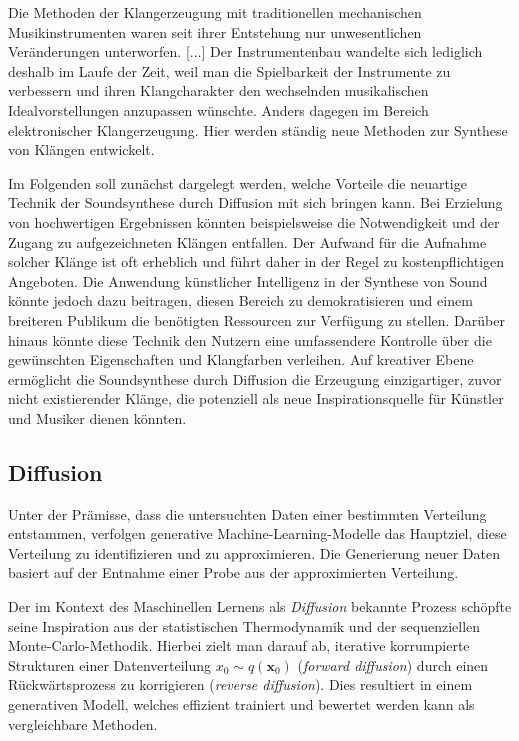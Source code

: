 \documentclass[
  a4paper,  %
  twoside,  %
  bibliography=totoc,
  headsepline,
  cleardoublepage=empty,
  parskip=half,
  draft=false
]{scrbook}
\begin{document}
\glqq Die Methoden der Klangerzeugung mit traditionellen mechanischen Musikinstrumenten waren seit ihrer Entstehung nur unwesentlichen Veränderungen unterworfen. [...] Der Instrumentenbau wandelte sich lediglich deshalb im Laufe der Zeit, weil man die Spielbarkeit der Instrumente zu verbessern und ihren Klangcharakter den wechselnden musikalischen Idealvorstellungen anzupassen wünschte. Anders dagegen im Bereich elektronischer Klangerzeugung. Hier werden ständig neue Methoden zur Synthese von Klängen entwickelt.\grqq \, \cite{ruschkowski_elektronische_2019}

Im Folgenden soll zunächst dargelegt werden, welche Vorteile die neuartige Technik der Soundsynthese durch Diffusion mit sich bringen kann. Bei Erzielung von hochwertigen Ergebnissen könnten beispielsweise die Notwendigkeit und der Zugang zu aufgezeichneten Klängen entfallen. Der Aufwand für die Aufnahme solcher Klänge ist oft erheblich und führt daher in der Regel zu kostenpflichtigen Angeboten. Die Anwendung künstlicher Intelligenz in der Synthese von Sound könnte jedoch dazu beitragen, diesen Bereich zu demokratisieren und einem breiteren Publikum die benötigten Ressourcen zur Verfügung zu stellen. Darüber hinaus könnte diese Technik den Nutzern eine umfassendere Kontrolle über die gewünschten Eigenschaften und Klangfarben verleihen. Auf kreativer Ebene ermöglicht die Soundsynthese durch Diffusion die Erzeugung einzigartiger, zuvor nicht existierender Klänge, die potenziell als neue Inspirationsquelle für Künstler und Musiker dienen könnten. \cite{haohe_liu_audioldm_2023-1}


\subsection{Diffusion}
Unter der Prämisse, dass die untersuchten Daten einer bestimmten Verteilung entstammen, verfolgen generative Machine-Learning-Modelle das Hauptziel, diese Verteilung zu identifizieren und zu approximieren. Die Generierung neuer Daten basiert auf der Entnahme einer Probe aus der approximierten Verteilung.\cite{machine_learning_at_berkeley_diffusion_2022}

Der im Kontext des Maschinellen Lernens als \emph{Diffusion} bekannte Prozess\cite{sohl-dickstein_deep_2015, ho_denoising_2020, nichol_improved_2021, dhariwal_diffusion_2021} schöpfte seine Inspiration aus der statistischen Thermodynamik\cite{jarzynski_equilibrium_1997} und der sequenziellen Monte-Carlo-Methodik\cite{neal_annealed_1998}. Hierbei zielt man darauf ab, iterative korrumpierte Strukturen einer Datenverteilung $x_0\sim q(\mathbf{x}_0)$ (\emph{forward diffusion}) durch einen Rückwärtsprozess zu korrigieren (\emph{reverse diffusion}). Dies resultiert in einem generativen Modell, welches effizient trainiert und bewertet werden kann als vergleichbare Methoden.\cite{sohl-dickstein_deep_2015, nichol_improved_2021}
\end{document}
